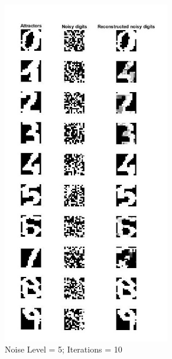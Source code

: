 \begin{figure}[ht]
	\begin{subfigure}[b]{0.26\textwidth}
		\centering
		\captionsetup{ width=0.8\linewidth, format = hang}
		\includegraphics[height = 1.2\textwidth, width = 0.8\textwidth]{Exercise2/Report/hdr_n5_itr10.jpg}
		\caption{Noise Level = 5; Iterations = 10}\label{fig:hop_digit1}
	\end{subfigure}%
	\begin{subfigure}[b]{0.26\textwidth}
		\centering
		\captionsetup{width=0.8\linewidth, format = hang}

\end{subfigure}
\end{figure}
